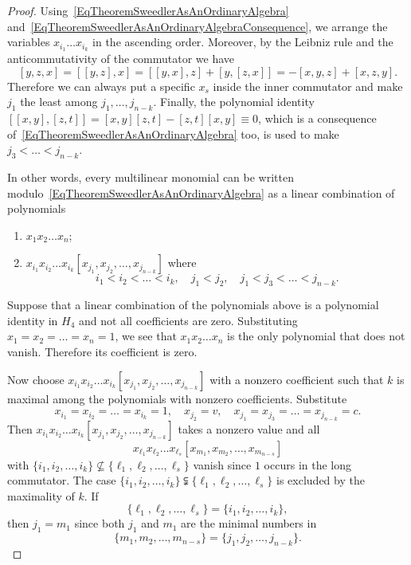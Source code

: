 \documentclass[12pt, reqno, a4paper]{amsart}
\theoremstyle{plain}
\theoremstyle{remark}
\theoremstyle{definition}
\numberwithin{equation}{section}
\begin{document}
\begin{proof}
	Using~\eqref{EqTheoremSweedlerAsAnOrdinaryAlgebra} and~\eqref{EqTheoremSweedlerAsAnOrdinaryAlgebraConsequence},
	we arrange the variables $x_{i_1} \ldots x_{i_k}$ in the ascending order.
	Moreover, by the Leibniz rule and the anticommutativity of the commutator we have $$[y,z,x]=[[y,z],x]=[[y,x],z]+[y,[z,x]]= -[x,y,z]+[x,z,y].$$
	Therefore we can always put a specific $x_s$ inside the inner commutator and make $j_1$ the least among $j_1, \ldots, j_{n-k}$.
	Finally, the polynomial identity $[[x,y],[z,t]]=[x,y][z,t]-[z,t][x,y]\equiv 0$,
	which is a consequence of~\eqref{EqTheoremSweedlerAsAnOrdinaryAlgebra} too,
	is used to make $j_3 < \ldots < j_{n-k}$.
	
	In other words, every multilinear monomial can be written modulo~\eqref{EqTheoremSweedlerAsAnOrdinaryAlgebra} as a linear combination
	of polynomials
	\begin{enumerate}
		\item $x_1 x_2 \ldots x_n$;
		\item $x_{i_1} x_{i_2}\ldots x_{i_k}[x_{j_1}, x_{j_2}, \ldots, x_{j_{n-k}}]$ where $$i_1 < i_2 < \ldots < i_k,\quad j_1 < j_2,\quad
		j_1 < j_3 < \ldots < j_{n-k}.$$
	\end{enumerate}

Suppose that a linear combination of the polynomials above is a polynomial identity in $H_4$
and not all coefficients are zero. Substituting $x_1 = x_2 = \ldots = x_n =1$,
we see that $x_1 x_2 \ldots x_n$ is the only polynomial that does not vanish. Therefore its coefficient is zero.

Now choose $x_{i_1} x_{i_2}\ldots x_{i_k}[x_{j_1}, x_{j_2}, \ldots, x_{j_{n-k}}]$ with a nonzero coefficient such that $k$ is maximal among the polynomials with nonzero coefficients.
Substitute \begin{equation}\label{EqSweedlerOrdinarySubstitution}
x_{i_1} = x_{i_2}=\ldots = x_{i_k} = 1,\quad
x_{j_2} = v,\quad x_{j_1}=x_{j_3}=\ldots = x_{j_{n-k}} = c.\end{equation} Then $x_{i_1} x_{i_2}\ldots x_{i_k}[x_{j_1}, x_{j_2}, \ldots, x_{j_{n-k}}]$ takes a nonzero value and all 
$$x_{\ell_1} x_{\ell_2}\ldots x_{\ell_s}[x_{m_1}, x_{m_2}, \ldots, x_{m_{n-s}}]$$ with $\lbrace i_1, i_2, \ldots, i_k \rbrace  \nsubseteq \lbrace \ell_1, \ell_2, \ldots, \ell_s \rbrace $ vanish
since $1$ occurs in the long commutator. 
The case $\lbrace i_1, i_2, \ldots, i_k \rbrace  \subsetneqq \lbrace \ell_1, \ell_2, \ldots, \ell_s \rbrace $
is excluded by the maximality of $k$.
If $$\lbrace \ell_1, \ell_2, \ldots, \ell_s \rbrace = \lbrace i_1, i_2, \ldots, i_k \rbrace,$$ then $j_1 = m_1$ since both $j_1$ and $m_1$ are the minimal numbers in $$\lbrace m_1, m_2, \ldots, m_{n-s} \rbrace = \lbrace j_1, j_2, \ldots, j_{n-k} \rbrace.$$


\end{proof}
\end{document}
